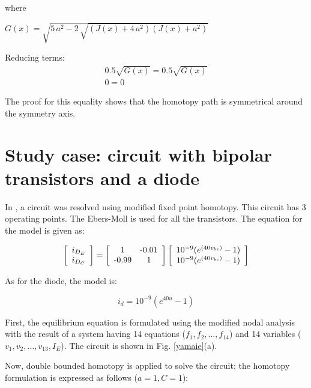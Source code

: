 \documentclass{elex}
\begin{document}
where {\small $G(x)=\sqrt {5\,{a}^{2}-2\,\sqrt { \left( J \left( x \right) +4 \,{a}^{2} \right)  \left( J \left( x \right) +{a}^{2} \right)}} $

Reducing terms:
\begin{displaymath}
\begin{array}{c}
0.5\sqrt{G(x)}=0.5\sqrt{G(x)} \\
0=0
\end{array}
\end{displaymath}

The proof for this equality shows that the homotopy path is symmetrical around the symmetry axis.

\section{Study case: circuit with bipolar transistors and a diode} 

In \cite{homo_yamamura}, a circuit was resolved using modified fixed point homotopy. This circuit has 3 operating points. The Ebers-Moll is used for all the transistors. The equation for the model is given as:

\begin{displaymath}
\left[ \begin{array}{c}
i_{D_E} \\
i_{D_C}
\end{array}\right] =
\left[ \begin{array}{cc} 1  & $-0.01$ \\
$-0.99$ & 1 \\
\end{array}\right] \left[ \begin{array}{c}
10^{-9}(e^{(40v_{be})} - 1) \\
10^{-9}(e^{(40v_{bc})} - 1)
\end{array}\right]
\end{displaymath}

As for the diode, the model is:

\begin{displaymath}
i_d=10^{-9}(e^{40u} - 1)
\end{displaymath}

First, the equilibrium equation is formulated using the modified nodal analysis with the result of a system having 14 equations ($f_1, f_2, \ldots, f_{14}$) and 14 variables ($v_1, v_2,\ldots,v_{13}, I_E$). The circuit is shown in Fig. \ref{yamaie}(a).



Now, double bounded homotopy is applied to solve the circuit; the homotopy formulation
is expressed as follows ($a=1, C=1$):

}
\end{document}
